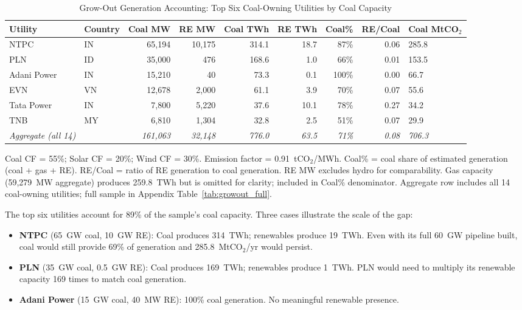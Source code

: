 \documentclass[review,3p,authoryear]{elsarticle}
\begin{document}
\begin{table}[H]
\centering
\caption{Grow-Out Generation Accounting: Top Six Coal-Owning Utilities by Coal Capacity}
\label{tab:growout}
\small
\begin{adjustbox}{max width=\linewidth}
\begin{tabular}{@{}llrrrrrrl@{}}
\toprule
\textbf{Utility} & \textbf{Country} & \textbf{Coal MW} & \textbf{RE MW} & \textbf{Coal TWh} & \textbf{RE TWh} & \textbf{Coal\%} & \textbf{RE/Coal} & \textbf{Coal MtCO$_2$} \\
\midrule
NTPC & IN & 65,194 & 10,175 & 314.1 & 18.7 & 87\% & 0.06 & 285.8 \\
PLN & ID & 35,000 & 476 & 168.6 & 1.0 & 66\% & 0.01 & 153.5 \\
Adani Power & IN & 15,210 & 40 & 73.3 & 0.1 & 100\% & 0.00 & 66.7 \\
EVN & VN & 12,678 & 2,000 & 61.1 & 3.9 & 70\% & 0.07 & 55.6 \\
Tata Power & IN & 7,800 & 5,220 & 37.6 & 10.1 & 78\% & 0.27 & 34.2 \\
TNB & MY & 6,810 & 1,304 & 32.8 & 2.5 & 51\% & 0.07 & 29.9 \\
\midrule
\textit{Aggregate (all 14)} & & \textit{161,063} & \textit{32,148} & \textit{776.0} & \textit{63.5} & \textit{71\%} & \textit{0.08} & \textit{706.3} \\
\bottomrule
\end{tabular}
\end{adjustbox}
\begin{flushleft}
\footnotesize{Coal CF = 55\%; Solar CF = 20\%; Wind CF = 30\%. Emission factor = 0.91~tCO$_2$/MWh. Coal\% = coal share of estimated generation (coal + gas + RE). RE/Coal = ratio of RE generation to coal generation. RE MW excludes hydro for comparability. Gas capacity (59,279~MW aggregate) produces 259.8~TWh but is omitted for clarity; included in Coal\% denominator. Aggregate row includes all 14 coal-owning utilities; full sample in Appendix Table~\ref{tab:growout_full}.}
\end{flushleft}
\end{table}


The top six utilities account for 89\% of the sample's coal capacity. Three cases illustrate the scale of the gap:

\begin{itemize}
\item \textbf{NTPC} (65~GW coal, 10~GW RE): Coal produces 314~TWh; renewables produce 19~TWh. Even with its full 60~GW pipeline built, coal would still provide 69\% of generation and 285.8~MtCO$_2$/yr would persist.
\item \textbf{PLN} (35~GW coal, 0.5~GW RE): Coal produces 169~TWh; renewables produce 1~TWh. PLN would need to multiply its renewable capacity 169 times to match coal generation.
\item \textbf{Adani Power} (15~GW coal, 40~MW RE): 100\% coal generation. No meaningful renewable presence.
\end{itemize}
\end{document}
